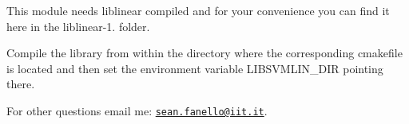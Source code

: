 This module needs {\ttfamily liblinear} compiled and for your convenience you can find it here in the {\ttfamily liblinear-\/1.} folder.

Compile the library from within the directory where the corresponding {\ttfamily cmakefile} is located and then set the environment variable {\ttfamily L\+I\+B\+S\+V\+M\+L\+I\+N\+\_\+\+D\+IR} pointing there.

For other questions email me\+: \href{mailto:sean.fanello@iit.it}{\tt sean.\+fanello@iit.\+it}. 